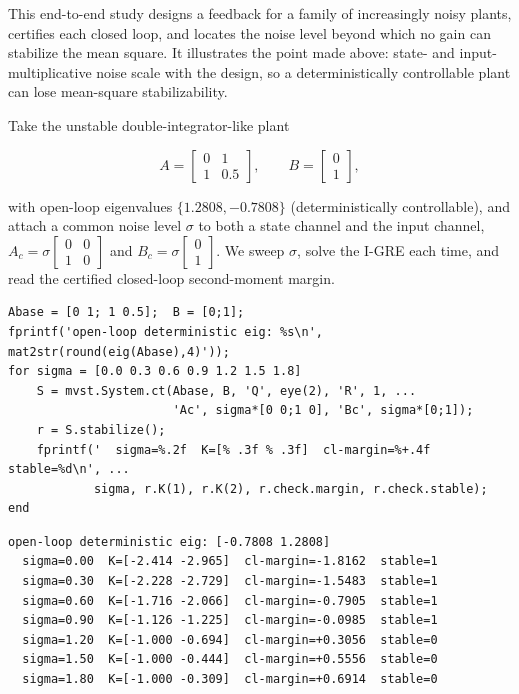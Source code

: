 \documentclass[11pt,oneside]{report}
\begin{document}
This end-to-end study designs a feedback for a family of increasingly noisy
plants, certifies each closed loop, and locates the noise level beyond which no
gain can stabilize the mean square. It illustrates the point made above: state-
and input-multiplicative noise scale with the design, so a deterministically
controllable plant can lose mean-square stabilizability.

Take the unstable double-integrator-like plant

\[A=\begin{bmatrix}0&1\\1&0.5\end{bmatrix},\qquad B=\begin{bmatrix}0\\1\end{bmatrix},\]

with open-loop eigenvalues \(\{1.2808,-0.7808\}\) (deterministically controllable),
and attach a common noise level \(\sigma\) to both a state channel and the input
channel, \(A_c=\sigma\begin{bmatrix}0&0\\1&0\end{bmatrix}\) and \(B_c=\sigma\begin{bmatrix}0\\1\end{bmatrix}\). We sweep \(\sigma\),
solve the I-GRE each time, and read the certified closed-loop second-moment
margin.

\begin{lstlisting}[style=matlabstyle]
Abase = [0 1; 1 0.5];  B = [0;1];
fprintf('open-loop deterministic eig: %s\n', mat2str(round(eig(Abase),4)'));
for sigma = [0.0 0.3 0.6 0.9 1.2 1.5 1.8]
    S = mvst.System.ct(Abase, B, 'Q', eye(2), 'R', 1, ...
                       'Ac', sigma*[0 0;1 0], 'Bc', sigma*[0;1]);
    r = S.stabilize();
    fprintf('  sigma=%.2f  K=[% .3f % .3f]  cl-margin=%+.4f  stable=%d\n', ...
            sigma, r.K(1), r.K(2), r.check.margin, r.check.stable);
end
\end{lstlisting}

\begin{lstlisting}[style=outputstyle]
open-loop deterministic eig: [-0.7808 1.2808]
  sigma=0.00  K=[-2.414 -2.965]  cl-margin=-1.8162  stable=1
  sigma=0.30  K=[-2.228 -2.729]  cl-margin=-1.5483  stable=1
  sigma=0.60  K=[-1.716 -2.066]  cl-margin=-0.7905  stable=1
  sigma=0.90  K=[-1.126 -1.225]  cl-margin=-0.0985  stable=1
  sigma=1.20  K=[-1.000 -0.694]  cl-margin=+0.3056  stable=0
  sigma=1.50  K=[-1.000 -0.444]  cl-margin=+0.5556  stable=0
  sigma=1.80  K=[-1.000 -0.309]  cl-margin=+0.6914  stable=0
\end{lstlisting}
\end{document}
